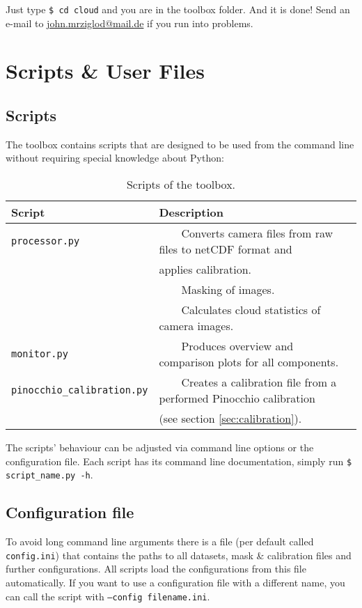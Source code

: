 \documentclass[11pt,a4paper]{article}
\newcommand{\tabitem}{~~\llap{\textbullet}~~}
\begin{document}
Just type \texttt{\$ cd cloud} and you are in the toolbox folder. And it is done! Send an e-mail to \href{mailto:john.mrziglod@mail.de}{john.mrziglod@mail.de} if you run into problems.

\section{Scripts \& User Files}
\label{sec:scripts-and-files}
\subsection{Scripts}
\label{sec:scripts}
The \cloud toolbox contains scripts that are designed to be used from the command line without requiring special knowledge about Python:

\begin{table}[h!]
	\centering
	\caption{Scripts of the \cloud toolbox.}
	\begin{tabular}{|l|l|}
	\hline 
	\textbf{Script} & \textbf{Description}\\ 
	\hline \hline 
	\texttt{processor.py} & \tabitem Converts camera files from raw files to netCDF format and\\ 
	& applies calibration.\\
	& \tabitem Masking of images.\\
	& \tabitem Calculates cloud statistics of camera images.\\ 
	\hline 
	\texttt{monitor.py} & \tabitem Produces overview and comparison plots for all components.\\ 
	\hline 
	\texttt{pinocchio\_calibration.py} &  \tabitem Creates a calibration file from a performed Pinocchio calibration\\
	& (see section \ref{sec:calibration}). \\ 
	\hline
	\end{tabular} 
\end{table}

The scripts' behaviour can be adjusted via command line options or the configuration file. Each script has its command line documentation, simply run \texttt{\$ script\_name.py -h}.

\subsection{Configuration file}
To avoid long command line arguments there is a file (per default called \texttt{config.ini}) that contains the paths to all datasets, mask \& calibration files and further configurations. All scripts load the configurations from this file automatically. If you want to use a configuration file with a different name, you can call the script with \texttt{--config filename.ini}.\\
\end{document}
